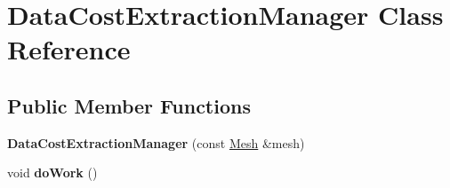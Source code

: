 \hypertarget{class_data_cost_extraction_manager}{}\section{Data\+Cost\+Extraction\+Manager Class Reference}
\label{class_data_cost_extraction_manager}
\subsection*{Public Member Functions}
\begin{DoxyCompactItemize}
\item 
\hypertarget{class_data_cost_extraction_manager_a90368fe041fe99c6ee45531ca69ae036}{}{\bfseries Data\+Cost\+Extraction\+Manager} (const \hyperlink{class_mesh}{Mesh} \&mesh)\label{class_data_cost_extraction_manager_a90368fe041fe99c6ee45531ca69ae036}

\item 
\hypertarget{class_data_cost_extraction_manager_a078e39ed154e6337584a2506a87c35e7}{}void {\bfseries do\+Work} ()\label{class_data_cost_extraction_manager_a078e39ed154e6337584a2506a87c35e7}

\end{DoxyCompactItemize}
